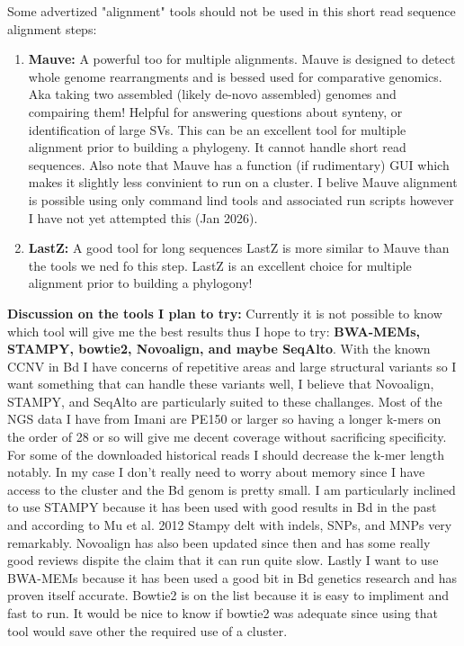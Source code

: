 \documentclass{article}
\begin{document}
    Some advertized "alignment" tools should not be used in this short read sequence alignment steps:
    \begin{enumerate}
        \item \textbf{Mauve:} A powerful too for multiple alignments.  Mauve is designed to detect whole genome rearrangments and is bessed used for comparative genomics.  Aka taking two assembled (likely de-novo assembled) genomes and compairing them!  Helpful for answering questions about synteny, or identification of large SVs.  This can be an excellent tool for multiple alignment prior to building a phylogeny. It cannot handle short read sequences.  Also note that Mauve has a function (if rudimentary) GUI which makes it slightly less convinient to run on a cluster.   I belive Mauve alignment is possible using only command lind tools and associated run scripts however I have not yet attempted this (Jan 2026).
        \item \textbf{LastZ:} A good tool for long sequences LastZ is more similar to Mauve than the tools we ned fo this step.  LastZ is an excellent choice for multiple alignment prior to building a phylogony!
    \end{enumerate}

    \textbf{Discussion on the tools I plan to try:}  Currently it is not possible to know which tool will give me the best results thus I hope to try: \textbf{BWA-MEMs, STAMPY, bowtie2, Novoalign, and maybe SeqAlto}.  With the known CCNV in Bd I have concerns of repetitive areas and large structural variants so I want something that can handle these variants well, I believe that Novoalign, STAMPY, and SeqAlto are particularly suited to these challanges.  Most of the NGS data I have from Imani are PE150 or larger so having a longer k-mers on the order of 28 or so will give me decent coverage without sacrificing specificity.  For some of the downloaded historical reads I should decrease the k-mer length notably.  In my case I don't really need to worry about memory since I have access to the cluster and the Bd genom is pretty small.   I am particularly inclined to use STAMPY because it has been used with good results in Bd in the past and according to Mu et al. 2012 \cite{muFastAccurateRead2012} Stampy delt with indels, SNPs, and MNPs very remarkably.  Novoalign has also been updated since then and has some really good reviews dispite the claim that it can run quite slow.    Lastly I want to use BWA-MEMs because it has been used a good bit in Bd genetics research and has proven itself accurate.   Bowtie2 is on the list because it is easy to impliment and fast to run.   It would be nice to know if bowtie2 was adequate since using that tool would save other the required use of a cluster.
\end{document}
